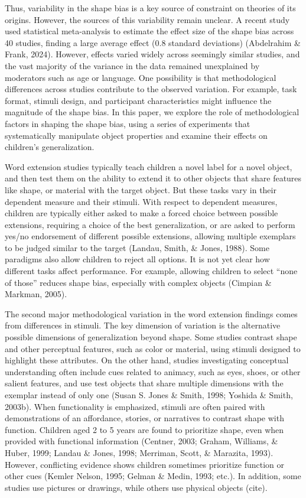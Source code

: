 \documentclass[10pt, letterpaper]{article}
\begin{document}
Thus, variability in the shape bias is a key source of constraint on
theories of its origins. However, the sources of this variability remain
unclear. A recent study used statistical meta-analysis to estimate the
effect size of the shape bias across 40 studies, finding a large average
effect (0.8 standard deviations) (Abdelrahim \& Frank, 2024). However,
effects varied widely across seemingly similar studies, and the vast
majority of the variance in the data remained unexplained by moderators
such as age or language. One possibility is that methodological
differences across studies contribute to the observed variation. For
example, task format, stimuli design, and participant characteristics
might influence the magnitude of the shape bias. In this paper, we
explore the role of methodological factors in shaping the shape bias,
using a series of experiments that systematically manipulate object
properties and examine their effects on children's generalization.

Word extension studies typically teach children a novel label for a
novel object, and then test them on the ability to extend it to other
objects that share features like shape, or material with the target
object. But these tasks vary in their dependent measure and their
stimuli. With respect to dependent measures, children are typically
either asked to make a forced choice between possible extensions,
requiring a choice of the best generalization, or are asked to perform
yes/no endorsement of different possible extensions, allowing multiple
exemplars to be judged similar to the target (Landau, Smith, \& Jones,
1988). Some paradigms also allow children to reject all options. It is
not yet clear how different tasks affect performance. For example,
allowing children to select ``none of those'' reduces shape bias,
especially with complex objects (Cimpian \& Markman, 2005).

The second major methodological variation in the word extension findings
comes from differences in stimuli. The key dimension of variation is the
alternative possible dimensions of generalization beyond shape. Some
studies contrast shape and other perceptual features, such as color or
material, using stimuli designed to highlight these attributes. On the
other hand, studies investigating conceptual understanding often include
cues related to animacy, such as eyes, shoes, or other salient features,
and use test objects that share multiple dimensions with the exemplar
instead of only one (Susan S. Jones \& Smith, 1998; Yoshida \& Smith,
2003b). When functionality is emphasized, stimuli are often paired with
demonstrations of an affordance, stories, or narratives to contrast
shape with function. Children aged 2 to 5 years are found to prioritize
shape, even when provided with functional information (Centner, 2003;
Graham, Williams, \& Huber, 1999; Landau \& Jones, 1998; Merriman,
Scott, \& Marazita, 1993). However, conflicting evidence shows children
sometimes prioritize function or other cues (Kemler Nelson, 1995; Gelman
\& Medin, 1993; etc.). In addition, some studies use pictures or
drawings, while others use physical objects (cite).
\end{document}
